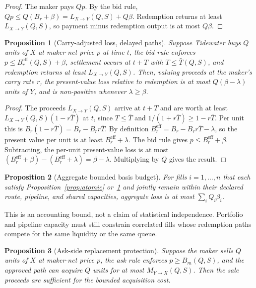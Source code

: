 \documentclass[10pt,twocolumn]{article}
\newtheorem{proposition}{Proposition}
\theoremstyle{definition}
\newcommand{\Lb}{L_{X\to Y}}
\newcommand{\Mb}{M_{Y\to X}}
\newcommand{\Br}{B_{r}}
\newcommand{\Bre}{B_{r}^{\mathrm{eff}}}
\newcommand{\Bm}{B_{m}}
\begin{document}
\begin{proof}
The maker pays $Qp$. By the bid rule, $Qp \le Q(\Br+\beta) = \Lb(Q,S) + Q\beta$. Redemption returns at least
$\Lb(Q,S)$, so payment minus redemption output is at most $Q\beta$.
\end{proof}

\begin{proposition}[Carry-adjusted loss, delayed paths]
\label{prop:delay}
Suppose Tidewater buys $Q$ units of $X$ at maker-net price $p$ at time $t$, the bid rule enforces
$p \le \Bre(Q,S) + \beta$, settlement occurs at $t + T$ with $T \le \bar{T}(Q,S)$, and redemption returns at least
$\Lb(Q,S)$. Then, valuing proceeds at the maker's carry rate $r$, the present-value loss relative to redemption is
at most $Q(\beta - \lambda)$ units of $Y$, and is non-positive whenever $\lambda \ge \beta$.
\end{proposition}

\begin{proof}
The proceeds $\Lb(Q,S)$ arrive at $t+T$ and are worth at least $\Lb(Q,S)(1 - r\bar{T})$ at $t$, since
$T \le \bar T$ and $1/(1+r\bar T) \ge 1 - r\bar T$. Per unit this is $\Br(1-r\bar T) = \Br - \Br r \bar T$. By
definition $\Bre = \Br - \Br r\bar T - \lambda$, so the present value per unit is at least $\Bre + \lambda$. The
bid rule gives $p \le \Bre + \beta$. Subtracting, the per-unit present-value loss is at most
$(\Bre + \beta) - (\Bre + \lambda) = \beta - \lambda$. Multiplying by $Q$ gives the result.
\end{proof}

\begin{proposition}[Aggregate bounded basis budget]
For fills $i = 1,\dots,n$ that each satisfy Proposition~\ref{prop:atomic} or~\ref{prop:delay} and jointly remain
within their declared route, pipeline, and shared capacities, aggregate loss is at most $\sum_i Q_i \beta_i$.
\end{proposition}

\noindent This is an accounting bound, not a claim of statistical independence. Portfolio and pipeline capacity
must still constrain correlated fills whose redemption paths compete for the same liquidity or the same queue.

\begin{proposition}[Ask-side replacement protection]
Suppose the maker sells $Q$ units of $X$ at maker-net price $p$, the ask rule enforces $p \ge \Bm(Q,S)$, and the
approved path can acquire $Q$ units for at most $\Mb(Q,S)$. Then the sale proceeds are sufficient for the bounded
acquisition cost.
\end{proposition}
\end{document}
